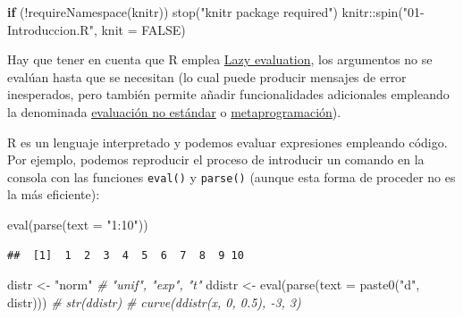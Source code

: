 \documentclass[
]{book}
\newenvironment{Shaded}{\begin{snugshade}}{\end{snugshade}}
\newcommand{\AttributeTok}[1]{\textcolor[rgb]{0.77,0.63,0.00}{#1}}
\newcommand{\CommentTok}[1]{\textcolor[rgb]{0.56,0.35,0.01}{\textit{#1}}}
\newcommand{\ConstantTok}[1]{\textcolor[rgb]{0.00,0.00,0.00}{#1}}
\newcommand{\ControlFlowTok}[1]{\textcolor[rgb]{0.13,0.29,0.53}{\textbf{#1}}}
\newcommand{\FunctionTok}[1]{\textcolor[rgb]{0.00,0.00,0.00}{#1}}
\newcommand{\NormalTok}[1]{#1}
\newcommand{\OtherTok}[1]{\textcolor[rgb]{0.56,0.35,0.01}{#1}}
\newcommand{\SpecialCharTok}[1]{\textcolor[rgb]{0.00,0.00,0.00}{#1}}
\newcommand{\StringTok}[1]{\textcolor[rgb]{0.31,0.60,0.02}{#1}}
\theoremstyle{break}
\theoremstyle{nonumberplain}
\begin{document}
\begin{Shaded}
\begin{Highlighting}[]
\ControlFlowTok{if}\NormalTok{ (}\SpecialCharTok{!}\FunctionTok{requireNamespace}\NormalTok{(knitr)) }\FunctionTok{stop}\NormalTok{(}\StringTok{"\textquotesingle{}knitr\textquotesingle{} package required"}\NormalTok{)}
\NormalTok{knitr}\SpecialCharTok{::}\FunctionTok{spin}\NormalTok{(}\StringTok{"01{-}Introduccion.R"}\NormalTok{, }\AttributeTok{knit =} \ConstantTok{FALSE}\NormalTok{)}
\end{Highlighting}
\end{Shaded}

Hay que tener en cuenta que R emplea \href{https://adv-r.hadley.nz/functions.html\#lazy-evaluation}{Lazy evaluation}, los argumentos no se evalúan hasta que se necesitan (lo cual puede producir mensajes de error inesperados, pero también permite añadir funcionalidades adicionales empleando la denominada \href{http://adv-r.had.co.nz/Computing-on-the-language.html}{evaluación no estándar} o \href{https://adv-r.hadley.nz/metaprogramming.html}{metaprogramación}).

R es un lenguaje interpretado y podemos evaluar expresiones empleando código.
Por ejemplo, podemos reproducir el proceso de introducir un comando en la consola con las funciones \texttt{eval()} y \texttt{parse()} (aunque esta forma de proceder no es la más eficiente):

\begin{Shaded}
\begin{Highlighting}[]
\FunctionTok{eval}\NormalTok{(}\FunctionTok{parse}\NormalTok{(}\AttributeTok{text =} \StringTok{"1:10"}\NormalTok{))}
\end{Highlighting}
\end{Shaded}

\begin{verbatim}
##  [1]  1  2  3  4  5  6  7  8  9 10
\end{verbatim}

\begin{Shaded}
\begin{Highlighting}[]
\NormalTok{distr }\OtherTok{\textless{}{-}} \StringTok{"norm"}  \CommentTok{\# "unif", "exp", "t"}
\NormalTok{ddistr }\OtherTok{\textless{}{-}} \FunctionTok{eval}\NormalTok{(}\FunctionTok{parse}\NormalTok{(}\AttributeTok{text =} \FunctionTok{paste0}\NormalTok{(}\StringTok{"d"}\NormalTok{, distr)))}
\CommentTok{\# str(ddistr)}
\CommentTok{\# curve(ddistr(x, 0, 0.5), {-}3, 3)}
\end{Highlighting}
\end{Shaded}
\end{document}
